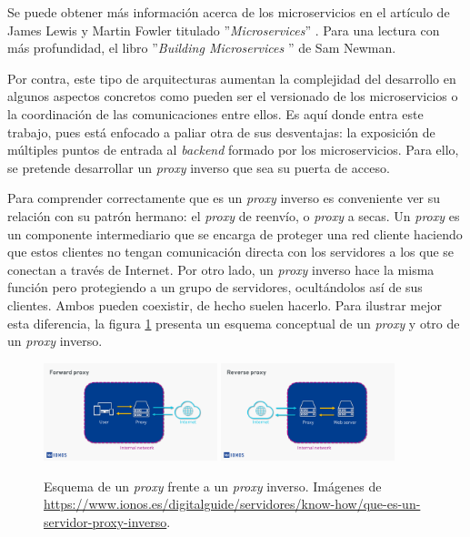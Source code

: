 \documentclass[11pt,spanish,listoffigures]{tfgetsinf}
\begin{document}
Se puede obtener más información acerca de los microservicios en el artículo de James Lewis y Martin Fowler titulado ''\emph{Microservices}'' \cite{LewisAndFowler}. Para una lectura con más profundidad, el libro ''\emph{Building Microservices} \cite{Newman}'' de Sam Newman.

Por contra, este tipo de arquitecturas aumentan la complejidad del desarrollo en algunos aspectos concretos como pueden ser el versionado de los microservicios o la coordinación de las comunicaciones entre ellos. Es aquí donde entra este trabajo, pues está enfocado a paliar otra de sus desventajas: la exposición de múltiples puntos de entrada al \emph{backend} formado por los microservicios. Para ello, se pretende desarrollar un \emph{proxy} inverso que sea su puerta de acceso.

Para comprender correctamente que es un \emph{proxy} inverso es conveniente ver su relación con su patrón hermano: el \emph{proxy} de reenvío, o \emph{proxy} a secas. Un \emph{proxy} es un componente intermediario que se encarga de proteger una red cliente haciendo que estos clientes no tengan comunicación directa con los servidores a los que se conectan a través de Internet. Por otro lado, un \emph{proxy} inverso hace la misma función pero protegiendo a un grupo de servidores, ocultándolos así de sus clientes. Ambos pueden coexistir, de hecho suelen hacerlo. Para ilustrar mejor esta diferencia, la figura \ref{figura:proxy_vs_proxyInverso} presenta un esquema conceptual de un \emph{proxy} y otro de un \emph{proxy} inverso.

\begin{figure}[ht]
\centering
\label{figura:proxy_vs_proxyInverso}
\includegraphics[width=0.45\textwidth]{images/proxy}
\includegraphics[width=0.45\textwidth]{images/proxyInverso}
\caption{Esquema de un \emph{proxy} frente a un \emph{proxy} inverso. Imágenes de \url{https://www.ionos.es/digitalguide/servidores/know-how/que-es-un-servidor-proxy-inverso}.}
\end{figure}
\end{document}
